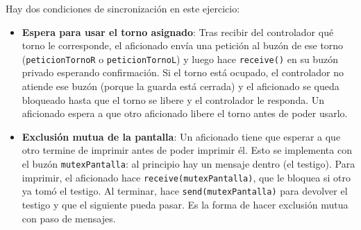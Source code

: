 \documentclass[12pt,a4paper]{article}
\begin{document}
Hay dos condiciones de sincronización en este ejercicio:
\begin{itemize}
  \item \textbf{Espera para usar el torno asignado}: Tras recibir del controlador qué torno le corresponde, el aficionado envía una petición al buzón de ese torno (\texttt{peticionTornoR} o \texttt{peticionTornoL}) y luego hace \texttt{receive()} en su buzón privado esperando confirmación. Si el torno está ocupado, el controlador no atiende ese buzón (porque la guarda está cerrada) y el aficionado se queda bloqueado hasta que el torno se libere y el controlador le responda. Un aficionado espera a que otro aficionado libere el torno antes de poder usarlo.
  \item \textbf{Exclusión mutua de la pantalla}: Un aficionado tiene que esperar a que otro termine de imprimir antes de poder imprimir él. Esto se implementa con el buzón \texttt{mutexPantalla}: al principio hay un mensaje dentro (el testigo). Para imprimir, el aficionado hace \texttt{receive(mutexPantalla)}, que le bloquea si otro ya tomó el testigo. Al terminar, hace \texttt{send(mutexPantalla)} para devolver el testigo y que el siguiente pueda pasar. Es la forma de hacer exclusión mutua con paso de mensajes.
\end{itemize}
\end{document}

